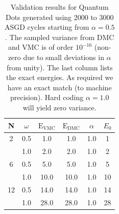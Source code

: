 \begin{table}
\begin{center}
\begin{tabular}{cc|cccc}
    N     & $\omega$ & $\mathrm{E_{VMC}}$ & $\mathrm{E_{DMC}}$ & $\alpha$ & $E_0$ \\
\hline
    2     &   0.5    &   1.0    &   1.0    &   1.0    & 1 \\
          &   1.0    &   2.0    &   2.0    &   1.0    & 2 \\
    6     &   0.5    &   5.0    &   5.0    &   1.0    & 5 \\
          &   1.0    &   10.0   &   10.0   &   1.0    & 10 \\
    12    &   0.5    &   14.0   &   14.0   &   1.0    & 14 \\
          &   1.0    &   28.0   &   28.0   &   1.0    & 28 \\
\end{tabular}
\caption{Validation results for Quantum Dots generated using 2000 to 3000 ASGD cycles starting from $\alpha=0.5$. The sampled variance from DMC and VMC is of order $10^{-16}$ (non-zero due to small deviations in $\alpha$ from unity). The last column lists the exact energies. As required we have an exact match (to machine precision). Hard coding $\alpha=1.0$ will yield zero variance.}
\label{tab:res_valid_qdots}
\end{center}
\end{table}


